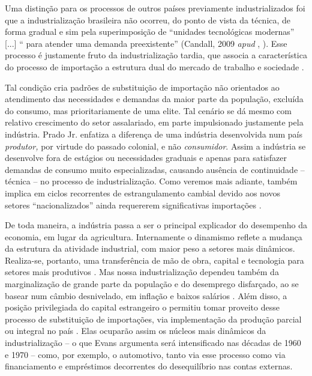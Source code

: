 Uma distinção para os processos de outros países previamente
industrializados foi que a industrialização brasileira não ocorreu, do
ponto de vista da técnica, de forma gradual e sim pela superimposição de
``unidades tecnológicas modernas'' {[}...{]} `` para atender uma demanda
preexistente'' (Candall, 2009 \emph{apud} \citeauthor{feijo_industrializacao_2023},
\citeyear{feijo_industrializacao_2023}). Esse processo é justamente fruto da
industrialização tardia, que associa a característica do processo
de importação a estrutura dual do mercado de trabalho e sociedade . 

Tal condição cria padrões de substituição de importação não orientados ao
atendimento das necessidades e demandas da maior parte da população,
excluída do consumo, mas prioritariamente de uma elite. Tal cenário se
dá mesmo com relativo crescimento do setor assalariado, em parte
impulsionado justamente pela indústria. Prado Jr. \citeyearpar[]{jr_historia_2021}
enfatiza a diferença de uma indústria desenvolvida num país \emph{produtor,} por virtude do
passado colonial, e não \emph{consumidor}. Assim a indústria se
desenvolve fora de estágios ou necessidades graduais e apenas para
satisfazer demandas de consumo muito especializadas, causando ausência
de continuidade -- técnica -- no processo de industrialização. Como
veremos mais adiante, também implica em ciclos recorrentes de
estrangulamento cambial devido aos novos setores ``nacionalizados''
ainda requererem significativas importações \cite{tavares1973}.

\begin{esboco}
\end{esboco}

De toda maneira, a indústria passa a ser o principal explicador do
desempenho da economia, em lugar da agricultura. Internamente o
dinamismo reflete a mudança da estrutura da atividade industrial, com
maior peso a setores mais dinâmicos. Realiza-se, portanto, uma
transferência de mão de obra, capital e tecnologia para setores mais
produtivos \citep{feijo_industrializacao_2023}. Mas nossa industrialização dependeu também da
marginalização de grande parte da população e do desemprego disfarçado,
ao se basear num câmbio desnivelado, em inflação e baixos salários
\citep{pradojunior2012}. Além disso, a posição privilegiada do
capital estrangeiro o permitiu tomar proveito desse processo de substituição de
importações, via implementação da produção parcial ou integral no país \citep{pradojunior2012}.
Elas ocuparão assim os núcleos mais dinâmicos da industrialização -- o que
Evans \citeyearpar{evans_dependent_1979} argumenta será intensificado nas décadas
de 1960 e 1970 --  como, por exemplo, o automotivo,
tanto via esse processo como via financiamento e
empréstimos decorrentes do desequilíbrio nas contas
externas.

